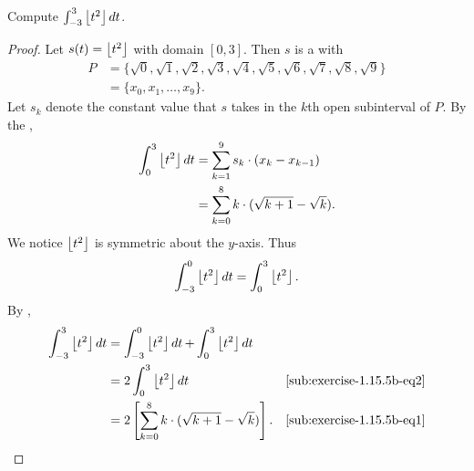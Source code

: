 \documentclass{report}
\begin{document}
\subsubsection{}%
\label{ssub:exercise-1.15.5b}

Compute $\int_{-3}^3 \left\lfloor t^2\right\rfloor \mathop{dt}$.

\begin{proof}

  Let $s(t) = \left\lfloor t^2\right\rfloor$ with domain $[0, 3]$.
  Then $s$ is a  with 
    \begin{align*}
      P
        & = \{\sqrt{0}, \sqrt{1}, \sqrt{2}, \sqrt{3}, \sqrt{4}, \sqrt{5},
              \sqrt{6}, \sqrt{7}, \sqrt{8}, \sqrt{9}\} \\
        & = \{x_0, x_1, \ldots, x_9\}.
    \end{align*}
  Let $s_k$ denote the constant value that $s$ takes in the $k$th open
    subinterval of $P$.
  By the ,
    \begin{align}
      \int_0^3 \left\lfloor t^2\right\rfloor \mathop{dt}
        & = \sum_{k=1}^9 s_k \cdot (x_k - x_{k-1})
          \nonumber \\
        & = \sum_{k=0}^8 k \cdot (\sqrt{k + 1} - \sqrt{k}).
          \label{sub:exercise-1.15.5b-eq1}
    \end{align}
  We notice $\left\lfloor t^2\right\rfloor$ is symmetric about the $y$-axis.
  Thus
    \begin{equation}
      \label{sub:exercise-1.15.5b-eq2}
      \int_{-3}^0 \left\lfloor t^2\right\rfloor \mathop{dt} = \int_0^3 \left\lfloor t^2\right\rfloor.
    \end{equation}
  By ,
    \begin{align*}
      \int_{-3}^3 \left\lfloor t^2\right\rfloor \mathop{dt}
        & = \int_{-3}^0 \left\lfloor t^2\right\rfloor \mathop{dt} +
            \int_0^3 \left\lfloor t^2\right\rfloor \mathop{dt} \\
        & = 2\int_0^3 \left\lfloor t^2\right\rfloor \mathop{dt}
          & \eqref{sub:exercise-1.15.5b-eq2} \\
        & = 2 \left[\sum_{k=0}^8 k \cdot (\sqrt{k + 1} - \sqrt{k})\right].
          & \eqref{sub:exercise-1.15.5b-eq1}
    \end{align*}

\end{proof}

\subsection{}%
\label{sub:exercise-1.15.7}
\end{document}
